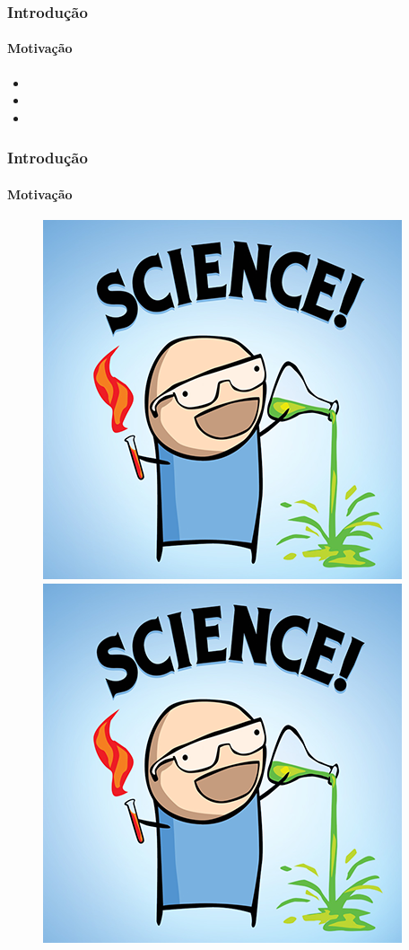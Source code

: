 \begin{frame}
\frametitle{Introdução}
    \framesubtitle{Motivação}
        
        \begin{itemize}[<+->]
            \item \myliplip
            \item \myliplip
            \item \myliplip
        \end{itemize}
\end{frame}

\begin{frame}
    \frametitle{Introdução}
        \framesubtitle{Motivação}
            \begin{figure}
                \centering
                \begin{minipage}{.5\textwidth}
                    \centering
                    \includegraphics[width=0.85\linewidth]{figures/science.png}
                \end{minipage}%
                \begin{minipage}{.5\textwidth}
                    \centering
                    \includegraphics[width=0.85\linewidth]{figures/science.png}

\end{minipage}
\end{figure}
\end{frame}
